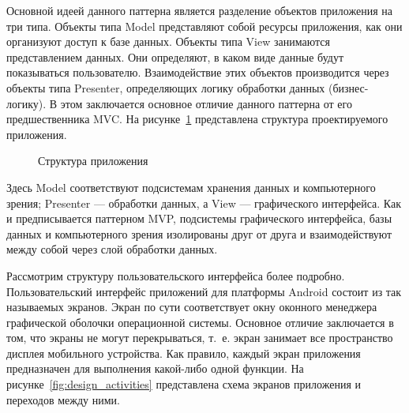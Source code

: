 Основной идеей данного паттерна является разделение объектов приложения на три типа.
Объекты типа Model представляют собой ресурсы приложения, как они организуют доступ
к базе данных. Объекты типа View занимаются представлением данных. Они определяют,
в каком виде данные будут показываться пользователю. Взаимодействие этих объектов
производится через объекты типа Presenter, определяющих логику
обработки данных (бизнес-логику). В этом заключается основное отличие данного паттерна от
его предшественника MVC.
На рисунке~\ref{fig:design_main} представлена структура проектируемого приложения.

\begin{figure}[h!]
  \centering
  \caption{Структура приложения}
  \label{fig:design_main}
\end{figure}

Здесь Model соответствуют подсистемам хранения данных и компьютерного зрения;
Presenter --- обработки данных, а View --- графического интерфейса.
Как и предписывается паттерном MVP, подсистемы графического интерфейса,
базы данных и компьютерного зрения изолированы друг от друга и взаимодействуют
между собой через слой обработки данных.

Рассмотрим структуру пользовательского интерфейса более подробно.
Пользовательский интерфейс приложений для платформы Android состоит
из так называемых экранов.
Экран по сути соответствует окну оконного менеджера графической оболочки
операционной системы. Основное отличие заключается в том, что
экраны не могут перекрываться, т.~е. экран занимает все пространство дисплея
мобильного устройства.
Как правило, каждый экран приложения предназначен
для выполнения какой-либо одной функции.
На рисунке~\ref{fig:design_activities} представлена схема экранов приложения
и переходов между ними.

